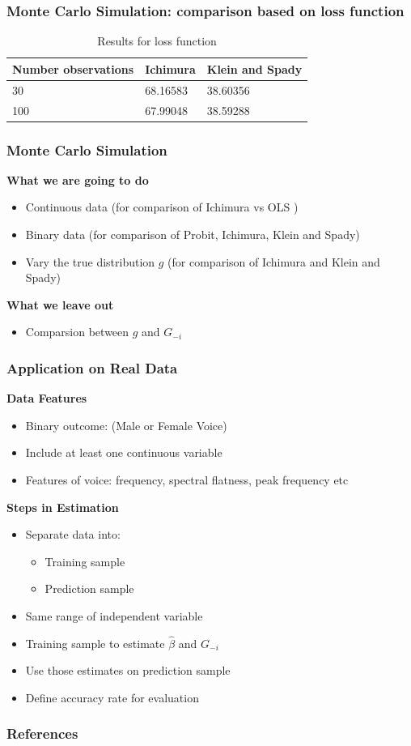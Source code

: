 \documentclass{beamer}
\begin{document}
 \begin{frame}[t]
	\frametitle{Monte Carlo Simulation: comparison based on loss function}

\begin{table}
\begin{tabular}{l l l}
\toprule
\textbf{Number observations} & \textbf{Ichimura} & \textbf{Klein and Spady}\\
\midrule
30 & 68.16583 & 38.60356 \\
100 & 67.99048 & 38.59288 \\
\bottomrule
\end{tabular}
\caption{Results for loss function}
\end{table}
	\note{~}
\end{frame}


\begin{frame}[t]
	\frametitle{Monte Carlo Simulation}

	\textbf{What we are going to do}
	\begin{itemize}
		\item Continuous data (for comparison of Ichimura vs OLS )
		\item Binary data (for comparison of Probit, Ichimura, Klein and Spady)
           \item Vary the true distribution $g$ (for comparison of Ichimura and Klein and Spady)
	\end{itemize}
	\textbf{What we leave out}
	\begin{itemize}
		\item Comparsion between $g$ and $ G_{-i} $
	\end{itemize}
	\note{~}
\end{frame}


\begin{frame}
	\frametitle{Application on Real Data}
	
	\textbf{Data Features}
	\begin{itemize}
		\item Binary outcome: (Male or Female Voice)
		\item Include at least one continuous variable
		\item Features of voice: frequency, spectral flatness, peak frequency etc
	\end{itemize}
	\textbf{Steps in Estimation}
	\begin{itemize}
		\item Separate data into:
		\begin{itemize}
			\item Training sample
			\item Prediction sample
		\end{itemize}
		\item Same range of independent variable 
		\item Training sample to estimate $\hat{\beta}$ and $G_{-i}$
		\item Use those estimates on prediction sample
		\item Define accuracy rate for evaluation
	\end{itemize}
	\note{~}
\end{frame}

\begin{frame}[allowframebreaks]
    \frametitle{References}
    \renewcommand{\bibfont}{\normalfont\footnotesize}
    \printbibliography
\end{frame}
\end{document}
